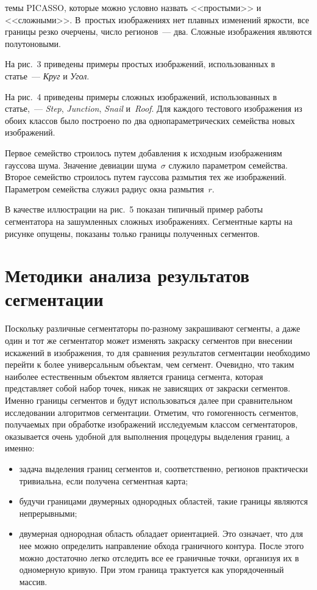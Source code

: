 \begin{multicols}{2}

\noindent 
те\-мы \mbox{PICASSO}, которые можно условно назвать
<<простыми>> и <<сложными>>. В~простых изображениях нет плавных 
изменений яркости, все границы резко очерчены, число регионов~--- два. 
Сложные изображения являются полутоновыми.
  
  На рис.~3 приведены примеры простых изображений, использованных в 
статье~--- \textit{Круг} и \textit{Угол}.
      
  На рис.~4 приведены примеры сложных изображений, использованных в 
статье,~--- \textit{Step}, \textit{Junction},  \textit{Snail}  и~\textit{Roof}.
   Для каждого тестового изображения из обоих классов было построено по два 
одно\-па\-ра\-мет\-ри\-че\-ских семейства новых изображений. 

Первое семейство 
строилось путем добавления к исходным изображениям гауссова шума. 
Значение девиации шума~$\sigma$ служило параметром семейства. Второе 
семейство строилось путем гауссова размытия тех же изображений. 
Параметром семейства служил радиус окна размытия~$r$.
  
  В качестве иллюстрации на рис.~5 показан типичный пример работы 
сегментатора на зашумленных сложных изображениях. Сегментные карты на 
рисунке опущены, показаны только границы полученных сегментов.



  \section{Методики анализа результатов сегментации}
  
  Поскольку различные сегментаторы по-разному закрашивают сегменты, а 
даже один и тот же сегментатор может изменять закраску сегментов при 
внесении искажений в изображения, то для сравнения результатов сегментации 
необходимо перейти к более универсальным объектам, чем сегмент. Очевидно, 
что таким наиболее естественным объектом является граница сегмента, которая 
представляет собой набор точек, никак не зависящих от закраски сегментов. 
Именно границы сегментов и будут использоваться далее при сравнительном 
исследовании алгоритмов сегментации. Отметим, что гомогенность сегментов, 
получаемых при обработке изображений исследуемым классом сегментаторов, 
оказывается очень удобной для выполнения процедуры выделения границ, а 
именно:
  \begin{itemize}
\item задача выделения границ сегментов и, соответственно, регионов 
практически тривиальна, если получена сегментная карта;
\item будучи границами двумерных однородных областей, такие границы 
являются непрерывными;
\item двумерная однородная область обладает ориентацией. Это означает, 
что для нее можно определить направление обхода граничного контура. 
После этого можно достаточно легко отследить все ее граничные точки, 
организуя их в одномерную кривую. При этом граница трактуется как 
упорядоченный массив.
\end{itemize}


\end{multicols}
